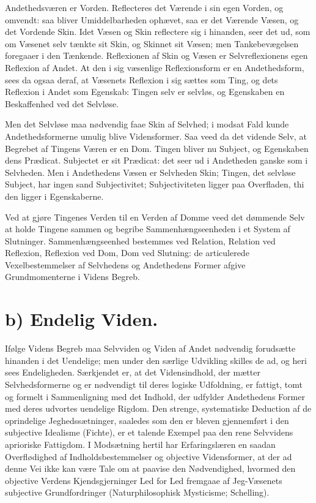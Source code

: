 \documentclass[12pt]{book}
\newcommand{\opage}[1]{\marginnote{\footnotesize\textit{[#1]}}}
\begin{document}
Andethedsværen er Vorden. Reflecteres det Værende i sin egen Vorden,
og omvendt: saa bliver Umiddelbarheden ophævet, saa er det Værende
Væsen, og det Vordende Skin. Idet Væsen og Skin reflectere sig i
hinanden, seer det ud, som om Væsenet selv tænkte sit Skin, og
Skinnet sit Væsen; men Tankebevægelsen foregaaer i den Tænkende.
Reflexionen af Skin og Væsen er Selvreflexionens egen Reflexion af
Andet. At den i sig væsenlige Reflexionsform er en Andethedsform,
sees da ogsaa deraf, at Væsenets Reflexion i sig sættes som Ting, og
dets Reflexion i Andet
\opage{8} som Egenskab: Tingen selv er selvløs, og Egenskaben en Beskaffenhed
ved det Selvløse.

Men det Selvløse maa nødvendig faae Skin af Selvhed; i modsat Fald
kunde Andethedsformerne umulig blive Vidensformer. Saa veed da det
vidende Selv, at Begrebet af Tingens Væren er en Dom. Tingen bliver
nu Subject, og Egenskaben dens Prædicat. Subjectet er sit Prædicat:
det seer ud i Andetheden ganske som i Selvheden. Men i Andethedens
Væsen er Selvheden Skin; Tingen, det selvløse Subject, har ingen sand
Subjectivitet; Subjectiviteten ligger paa Overfladen, thi den ligger
i Egenskaberne.

Ved at gjøre Tingenes Verden til en Verden af Domme veed det dømmende
Selv at holde Tingene sammen og begribe Sammenhængseenheden i et
System af Slutninger. Sammenhængseenhed bestemmes ved Relation,
Relation ved Reflexion, Reflexion ved Dom, Dom ved Slutning: de
articulerede Vexelbestemmelser af Selvhedens og Andethedens Former
afgive Grundmomenterne i Videns Begreb.

\section*{b) Endelig Viden.}

Ifølge Videns Begreb maa Selvviden og Viden af Andet nødvendig
forudsætte hinanden i det Uendelige; men under den særlige Udvikling
skilles de ad, og heri sees Endeligheden. Særkjendet er, at det
Vidensindhold, der mætter Selvhedsformerne og er nødvendigt til deres
logiske Udfoldning, er fattigt, tomt og formelt i Sammenligning med
det Indhold, der udfylder Andethedens Former med deres udvortes
uendelige Rigdom. Den strenge, systematiske Deduction af de
oprindelige Jeghedssætninger, saaledes som den er bleven gjennemført
i den subjective Idealisme (Fichte), er et talende Exempel paa den
rene Selvvidens aprioriske Fattigdom. I Modsætning hertil har
Erfaringslæren en saadan Overflødighed af Indholdsbestemmelser og
objective Vidensformer, at
\opage{9} %
der ad denne Vei ikke kan være Tale om at paavise den Nødvendighed,
hvormed den objective Verdens Kjendsgjerninger Led for Led fremgaae
af Jeg-Væsenets subjective Grundfordringer (Naturphilosophisk
Mysticisme; Schelling).
\end{document}
